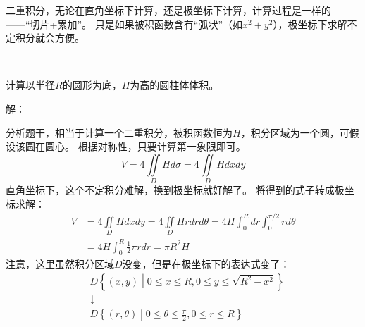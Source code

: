 二重积分，无论在直角坐标下计算，还是极坐标下计算，计算过程是一样的——“切片+累加”。
只是如果被积函数含有“弧状”（如$x^2+y^2$），极坐标下求解不定积分就会方便。

~

\begin{example}
计算以半径$R$的圆形为底，$H$为高的圆柱体体积。
\end{example}

解：

分析题干，相当于计算一个二重积分，被积函数恒为$H$，积分区域为一个圆，可假设该圆在圆心。
根据对称性，只要计算第一象限即可。
\[
V=4\iint\limits_D{Hd\sigma}=4\iint\limits_D{Hdxdy}
\]
直角坐标下，这个不定积分难解，换到极坐标就好解了。
将得到的式子转成极坐标求解：
\begin{align*}
V&=4\iint\limits_D{Hdxdy}=4\iint\limits_D{Hrdrd\theta}=4H\int_0^R{dr\int_0^{\pi /2}{rd\theta}} \\
&=4H\int_0^R{\frac{1}{2}\pi rdr}=\pi R^2H
\end{align*}
注意，这里虽然积分区域$D$没变，但是在极坐标下的表达式变了：
\begin{align*}
&D\left\{ \left( x,y \right) \middle| 0\leqslant x\leqslant R,0\leqslant y\leqslant \sqrt{R^2-x^2} \right\} \\
&\downarrow \\
&D\left\{ \left( r,\theta \right) \middle| 0\leqslant \theta \leqslant \frac{\pi}{2},0\leqslant r\leqslant R \right\}
\end{align*}




